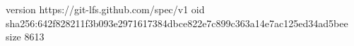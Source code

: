 version https://git-lfs.github.com/spec/v1
oid sha256:642f828211f3b093e2971617384dbce822e7c899c363a14e7ac125ed34ad5bee
size 8613
